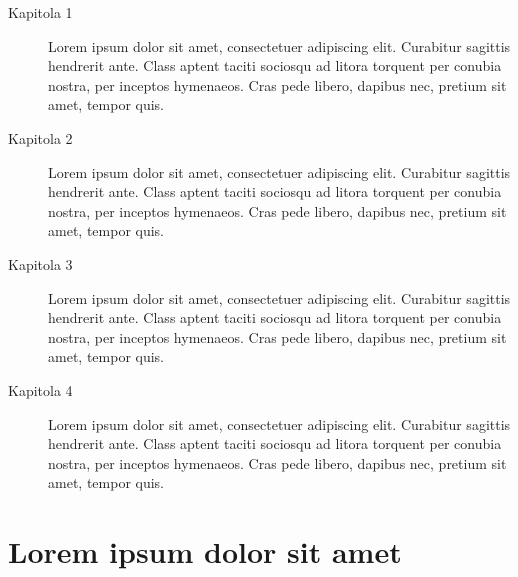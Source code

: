 \begin{description}
\item[Kapitola 1] Lorem ipsum dolor sit amet, consectetuer adipiscing elit. Curabitur sagittis hendrerit ante. Class aptent taciti sociosqu ad litora torquent per conubia nostra, per inceptos hymenaeos. Cras pede libero, dapibus nec, pretium sit amet, tempor quis.

\item[Kapitola 2] Lorem ipsum dolor sit amet, consectetuer adipiscing elit. Curabitur sagittis hendrerit ante. Class aptent taciti sociosqu ad litora torquent per conubia nostra, per inceptos hymenaeos. Cras pede libero, dapibus nec, pretium sit amet, tempor quis.

\item[Kapitola 3] Lorem ipsum dolor sit amet, consectetuer adipiscing elit. Curabitur sagittis hendrerit ante. Class aptent taciti sociosqu ad litora torquent per conubia nostra, per inceptos hymenaeos. Cras pede libero, dapibus nec, pretium sit amet, tempor quis.

\item[Kapitola 4] Lorem ipsum dolor sit amet, consectetuer adipiscing elit. Curabitur sagittis hendrerit ante. Class aptent taciti sociosqu ad litora torquent per conubia nostra, per inceptos hymenaeos. Cras pede libero, dapibus nec, pretium sit amet, tempor quis.~\cite{jakZiskatAcko}
\end{description}

\lipsum[2]

\section{Lorem ipsum dolor sit amet}

\lipsum[3-5]
